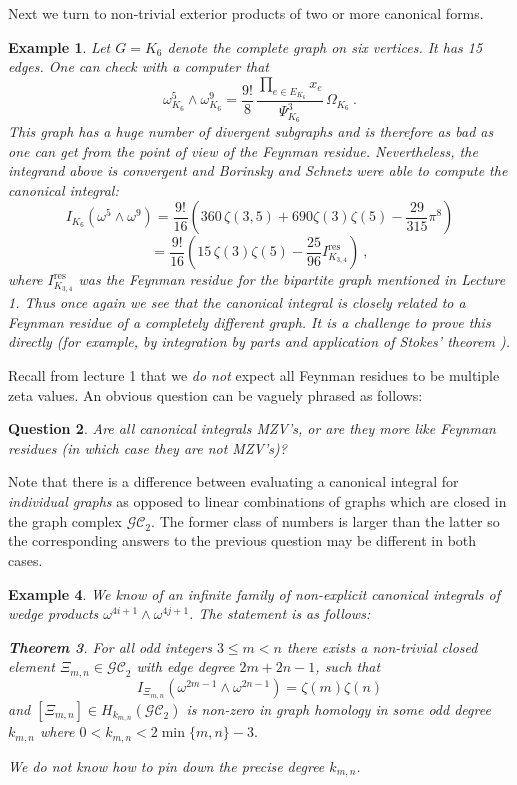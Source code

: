 \documentclass[12pt]{amsart}
\newcommand{\res}{\mathrm{res}}
\theoremstyle{plain}
\newtheorem{thm}{Theorem}
\newtheorem{quest}[thm]{Question}
\newtheorem{ex}[thm]{Example}
\newcommand{\GC}{\mathcal{GC}}
\newcommand{\0}{\color{blue}{\mathsf{0}}}
\begin{document}
 Next we turn to non-trivial exterior products of two or more canonical forms.
 
 \begin{ex} Let $G= K_6$ denote the complete graph on six vertices. It has  15 edges. 
 One can check with a computer that 
 \[ \omega_{K_6}^5 \wedge \omega_{K_6}^9 =  \frac{9!}{8} \, \frac{\prod_{e\in E_{K_6}} x_e}{\Psi_{K_6}^3}  \, \Omega_{K_6}\ .\]
 This graph has a huge number of divergent subgraphs and is therefore as bad as one can get from the point of view of the Feynman residue. Nevertheless, the integrand above is convergent and Borinsky and Schnetz were able to compute the canonical integral:
 \begin{equation} \label{IK6} I_{K_6}(\omega^5 \wedge \omega^9) = \frac{9!}{16} \left( 360\,  \zeta(3,5) + 690 \zeta(3) \zeta(5) - \frac{29}{315} \pi^8 \right)   \end{equation}
 \[ = \frac{9!}{16} \left( 15\, \zeta(3) \zeta(5)  - \frac{25}{96} I^{\res}_{K_{3,4}}\right) \ ,\]
 where $I^{\res}_{K_{3,4}}$ was the Feynman residue for the bipartite graph mentioned in Lecture 1. Thus once again we see that the canonical integral is closely related to a Feynman residue of a completely different graph. It is a challenge to prove this directly (for example, by integration by parts and application of Stokes' theorem \cite{BrSigma}).  
 \end{ex}

 Recall from lecture 1 that we \emph{do not} expect  all Feynman residues to be multiple zeta values. 
  An obvious  question  can be vaguely phrased as follows: 
 \begin{quest}
 Are all canonical integrals MZV's, or are they more like Feynman residues (in which case they are not MZV's)? 
 \end{quest} 
 Note that there is a difference between evaluating a canonical integral for \emph{individual graphs} as opposed to linear combinations of graphs which are closed in the graph complex $\GC_2$. The former class of numbers is larger than the latter so the corresponding answers to the previous question may be different in both cases. 
 
 
 \begin{ex} We know of an infinite family of non-explicit canonical integrals of wedge products $\omega^{4i+1} \wedge \omega^{4j+1}$. The
  statement is as follows: 
 
 \begin{thm}  \cite{BrownSchnetzoneformmatrices} For all odd integers $3\leq m<n$ there exists a non-trivial  closed element  $\Xi_{m,n} \in \GC_2$ with edge degree $2m+2n-1$, such that
 \[  I_{\Xi_{m,n}} (\omega^{2m-1} \wedge \omega^{2n-1}) = \zeta(m) \zeta(n)\]
 and $[\Xi_{m,n}]  \in H_{k_{m,n}}(\GC_2)$ is non-zero in graph homology in some odd  degree $k_{m,n}$ where  $0<k_{m,n}<  2 \min\{m,n\} -3.$
 \end{thm} 
 We do not know how to pin down the  precise degree $k_{m,n}$.
 \end{ex} 
 
\end{document}
